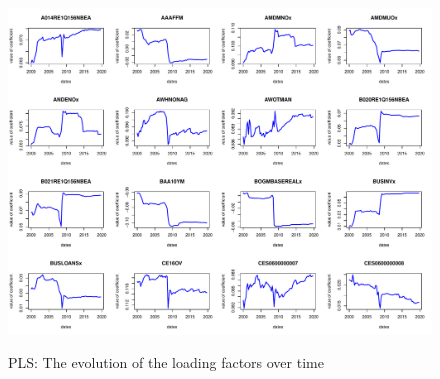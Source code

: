 \documentclass{article}
\begin{document}
\begin{subfigures}
\begin{figure}[hbt!]
\includegraphics[page = 13, width=\textwidth]{plots/pls_loads}
\label{fig:pls_loads}
\caption{\label{thirteenth}PLS: The evolution of the loading factors over time}
\centering
\end{figure}

\end{subfigures}

\clearpage

\clearpage
\end{document}
